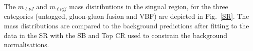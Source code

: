 \newline
The $m_{\ell \nu J}$ and $m_{\ell \nu jj}$ mass distributions in the singnal region, for the three categories (untagged, gluon-gluon fusion and VBF) are depicted in Fig.~\ref{SR}. 
The mass distributions are compared to the background
predictions after fitting to the data in the SR with the SB and Top CR used to constrain the
background normalisations. 
\begin{figure}[htbp]
\centering
{}
\\                                             
\end{figure}
